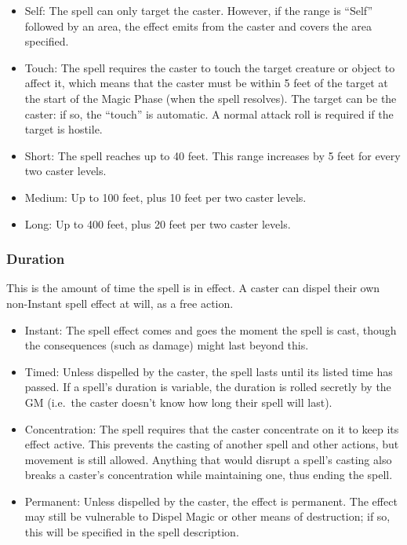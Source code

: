 \documentclass{book}
\providecommand{\tightlist}{%
\setlength{\itemsep}{0pt}\setlength{\parskip}{0pt}}
\begin{document}
\begin{itemize}
	\tightlist
	\item
	Self: The spell can only target the caster. However, if the range is
	``Self'' followed by an area, the effect emits from the caster and
	covers the area specified.
	\item
	Touch: The spell requires the caster to touch the target creature or
	object to affect it, which means that the caster must be within 5 feet
	of the target at the start of the Magic Phase (when the spell
	resolves). The target can be the caster: if so, the ``touch'' is
	automatic. A normal attack roll is required if the target is hostile.
	\item
	Short: The spell reaches up to 40 feet. This range increases by 5 feet
	for every two caster levels.
	\item
	Medium: Up to 100 feet, plus 10 feet per two caster levels.
	\item
	Long: Up to 400 feet, plus 20 feet per two caster levels.
\end{itemize}

\subsubsection*{Duration}\label{duration}

This is the amount of time the spell is in effect. A caster can dispel
their own non-Instant spell effect at will, as a free action.

\begin{itemize}
	\tightlist
	\item
	Instant: The spell effect comes and goes the moment the spell is cast,
	though the consequences (such as damage) might last beyond this.
	\item
	Timed: Unless dispelled by the caster, the spell lasts until its
	listed time has passed. If a spell's duration is variable, the
	duration is rolled secretly by the GM (i.e.~the caster doesn't know
	how long their spell will last).
	\item
	Concentration: The spell requires that the caster concentrate on it to
	keep its effect active. This prevents the casting of another spell and
	other actions, but movement is still allowed. Anything that would
	disrupt a spell's casting also breaks a caster's concentration while
	maintaining one, thus ending the spell.
	\item
	Permanent: Unless dispelled by the caster, the effect is permanent.
	The effect may still be vulnerable to Dispel Magic or other means of
	destruction; if so, this will be specified in the spell description.
\end{itemize}
\end{document}
